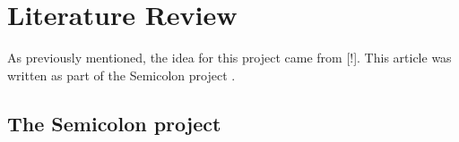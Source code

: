 \chapter{Literature Review}


As previously mentioned, the idea for this project came from [!]. This article was written as part of the Semicolon project \cite{semicolon}.


\section{The Semicolon project}
